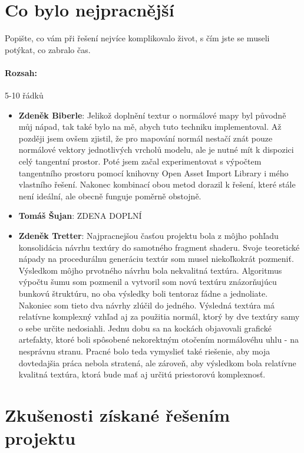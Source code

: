 \documentclass[12pt,a4paper,titlepage,final]{report}
\newcommand\AuthorA{Zdeněk Biberle}
\newcommand\AuthorB{Tomáš Šujan}
\newcommand\AuthorC{Zdeněk Tretter}
\begin{document}
\section{Co bylo nejpracnější}

Popište, co vám při řešení nejvíce komplikovalo život, s čím jste se museli
potýkat, co zabralo čas.

\paragraph{Rozsah:} 5-10 řádků

\begin{itemize}
\item \textbf{\AuthorA}: Jelikož doplnění textur o normálové mapy byl původně můj nápad, tak také bylo na mě, abych tuto techniku implementoval. Až později jsem ovšem zjistil, že pro mapování normál nestačí znát pouze normálové vektory jednotlivých vrcholů modelu, ale je nutné mít k dispozici celý tangentní prostor. Poté jsem začal experimentovat s výpočtem tangentního prostoru pomocí knihovny Open Asset Import Library i mého vlastního řešení. Nakonec kombinací obou metod dorazil k řešení, které stále není ideální, ale obecně funguje poměrně obstojně.
\item \textbf{\AuthorB}: ZDENA DOPLNÍ
\item \textbf{\AuthorC}: Najpracnejšou časťou projektu bola z môjho pohľadu konsolidácia návrhu textúry do samotného fragment shaderu. Svoje teoretické nápady na procedurálnu generáciu textúr som musel niekoľkokrát pozmeniť. Výsledkom môjho prvotného návrhu bola nekvalitná textúra.  Algoritmus výpočtu šumu som pozmenil a vytvoril som novú textúru znázorňujúcu bunkovú štruktúru, no oba výsledky boli tentoraz fádne a jednoliate. Nakoniec som tieto dva návrhy zlúčil do jedného. Výsledná textúra má relatívne komplexný vzhľad aj za použitia normál, ktorý by dve textúry samy o sebe určite nedosiahli. Jednu dobu sa na kockách objavovali grafické artefakty, ktoré boli spôsobené nekorektným otočením normálovéhu uhlu - na nesprávnu stranu. Pracné bolo teda vymyslieť také riešenie, aby moja dovtedajšia práca nebola stratená, ale zároveň, aby výsledkom bola relatívne kvalitná textúra, ktorá bude mať aj určitú priestorovú komplexnosť.
\end{itemize}


\section{Zkušenosti získané řešením projektu}
\end{document}
